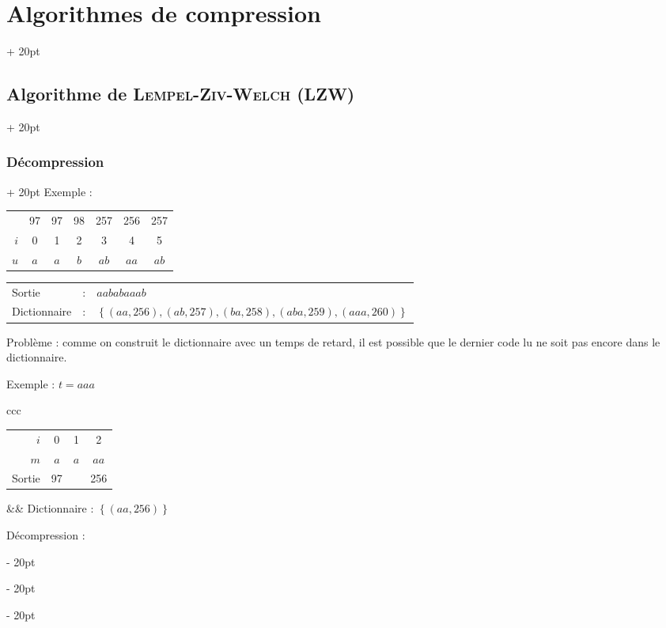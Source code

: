 \documentclass[a4paper, 12pt, twoside]{article}
\newcommand{\set}[1]{\left\{ #1 \right\}}
\newcommand{\ind}[1][20pt]{\advance\leftskip + #1}
\newcommand{\deind}[1][20pt]{\advance\leftskip - #1}
\newenvironment{indt}[2][20pt]{#2 \par \ind[#1]}{\par \deind} %
\begin{document}
\begin{indt}{\section{Algorithmes de compression}}
\begin{indt}{\subsection{Algorithme de \textsc{Lempel-Ziv-Welch} (LZW)}}
\begin{indt}{\subsubsection{Décompression}}
                Exemple :

                \begin{tabular}{r|cccccc}
                    & 97 & 97 & 98 & 257 & 256 & 257
                    \\
                    $i$ & 0 & 1 & 2 & 3 & 4 & 5
                    \\
                    $u$ & $a$ & $a$ & $b$ & $ab$ & $aa$ & $ab$
                \end{tabular}

                \vspace{6pt}
                
                \begin{tabular}{lcl}
                    Sortie &:& $aababaaab$
                    \\
                    Dictionnaire &:& $\set{(aa, 256), (ab, 257), (ba, 258), (aba, 259), (aaa, 260)}$
                \end{tabular}

                \vspace{18pt}
                
                Problème : comme on construit le dictionnaire avec un temps de retard, il est possible que le dernier code lu ne soit pas encore dans le dictionnaire.

                \vspace{12pt}
                
                Exemple : $t = aaa$

                \begin{tabular}{ccc}
                    \begin{tabular}{r|ccc}
                        $i$ & 0 & 1 & 2
                        \\
                        $m$ & $a$ & $a$ & $aa$
                        \\
                        Sortie & 97 & & 256
                    \end{tabular}
                    &&
                    Dictionnaire : $\set{(aa, 256)}$
                \end{tabular}

                \newpage
                
                Décompression :


\end{indt}
\end{indt}
\end{indt}
\end{document}
